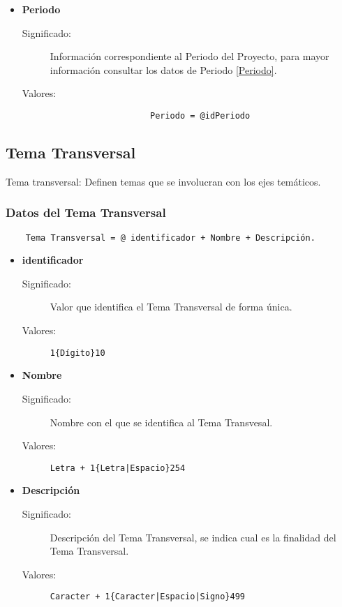 \begin{itemize}
	\item	\textbf{Periodo}
		\begin{description}
			\item[Significado:]Información correspondiente al Periodo del Proyecto, para mayor información consultar los datos de Periodo \ref{Periodo}.
			\item[Valores:]{\begin{lstlisting}
					Periodo = @idPeriodo 
				\end{lstlisting}}
		\end{description}
\end{itemize}


\subsection{Tema Transversal}
\label{dd:TemaTransversal}

Tema transversal: Definen temas que se involucran con los ejes temáticos.
\newline

\subsubsection{Datos del Tema Transversal}
\begin{lstlisting}
	Tema Transversal = @ identificador + Nombre + Descripción.
\end{lstlisting}
\begin{itemize}
	\item	\textbf{identificador}
		\begin{description}
			\item [Significado:] Valor que identifica el Tema Transversal de forma única.
			\item [Valores:]{\begin{lstlisting}
1{Dígito}10\end{lstlisting}}
		\end{description}
	\item \textbf{Nombre}
		\begin{description}
			\item [Significado:] Nombre con el que se identifica al Tema Transvesal.
			\item [Valores:]{\begin{lstlisting}
Letra + 1{Letra|Espacio}254\end{lstlisting}}
		\end{description}
\item	\textbf{Descripción}
		\begin{description}
			\item [Significado:] Descripción del Tema Transversal, se indica cual es la finalidad del Tema Transversal.
			\item [Valores:]{\begin{lstlisting}		             
Caracter + 1{Caracter|Espacio|Signo}499\end{lstlisting}}

		\end{description}
\end{itemize}


